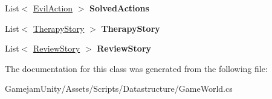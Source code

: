 \begin{DoxyCompactItemize}
\item 
\mbox{\label{class_person_af84f42f43c9ff1bc45ca5b33102d71cd}} 
List$<$ \mbox{\hyperlink{class_evil_action}{Evil\+Action}} $>$ {\bfseries Solved\+Actions}
\item 
\mbox{\label{class_person_a04726feefce2dae1e5b1d4641a7e44d4}} 
List$<$ \mbox{\hyperlink{class_therapy_story}{Therapy\+Story}} $>$ {\bfseries Therapy\+Story}
\item 
\mbox{\label{class_person_ab8970616a711e18b3647cd3904f401e5}} 
List$<$ \mbox{\hyperlink{class_review_story}{Review\+Story}} $>$ {\bfseries Review\+Story}
\end{DoxyCompactItemize}


The documentation for this class was generated from the following file\+:\begin{DoxyCompactItemize}
\item 
Gamejam\+Unity/\+Assets/\+Scripts/\+Datastructure/Game\+World.\+cs\end{DoxyCompactItemize}
